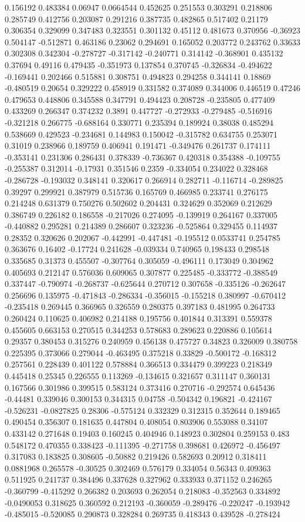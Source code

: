 0.156192 0.483384 0.06947 0.0664544 0.452625 0.251553 0.303291 0.218806 0.285749 0.412756 0.203087 0.291216 0.387735 0.482865 0.517402 0.21179 0.306354 0.329099 0.347483 0.323551 0.301132 0.45112 0.481673 0.370956 -0.36923 0.504147 -0.512871 0.463186 0.23062 0.294691 0.165052 0.203772 0.243762 0.33633 0.302308 0.342304 -0.278727 -0.317142 -0.240771 0.314142 -0.368901 0.435132 0.37694 0.49116 0.479435 -0.351973 0.137854 0.370745 -0.326834 -0.494622 -0.169441 0.202466 0.515881 0.308751 0.494823 0.294258 0.344141 0.18869 -0.480519 0.20654 0.329222 0.458919 0.331582 0.374089 0.344006 0.446519 0.47246 0.479653 0.448806 0.345588 0.347791 0.494423 0.208728 -0.235805 0.477409 0.433269 0.266347 0.374232 0.3891 0.447727 -0.272933 -0.279485 -0.516916 -0.321218 0.266775 -0.688164 0.330771 0.235394 0.189924 0.38038 0.485294 0.538669 0.429523 -0.234681 0.144983 0.150042 -0.315782 0.634755 0.253071 0.31019 0.238966 0.189759 0.406941 0.191471 -0.349476 0.261737 0.174111 -0.353141 0.231306 0.286431 0.378339 -0.736367 0.420318 0.354388 -0.109755 -0.255387 0.312014 -0.17931 0.351546 0.2359 -0.334054 0.234022 0.328468 -0.286728 -0.193032 0.348141 0.320617 0.266914 0.282711 -0.116714 -0.289825 0.39297 0.299921 0.387979 0.515736 0.165769 0.466985 0.233741 0.276175 0.214248 0.631379 0.750276 0.502602 0.204431 0.324629 0.352069 0.212629 0.386749 0.226182 0.186558 -0.217026 0.274095 -0.139919 0.264167 0.337005 -0.440882 0.295281 0.214389 0.286607 0.323236 -0.525864 0.329455 0.114937 0.28352 0.320626 0.202067 -0.442991 -0.447481 -0.195512 0.0533741 0.254785 0.363676 0.16402 -0.17724 0.241628 -0.039334 0.740965 0.198433 0.298548 0.335685 0.31373 0.455507 -0.307764 0.305059 -0.496111 0.173049 0.304962 0.405693 0.212147 0.576036 0.609065 0.307877 0.225485 -0.333772 -0.388549 0.337447 -0.790974 -0.268737 -0.625644 0.270712 0.307658 -0.335126 -0.262647 0.256696 0.135975 -0.471843 -0.286334 -0.356015 -0.155218 0.380997 -0.670412 -0.235418 0.269445 0.366965 0.326559 0.280375 0.397183 0.481995 0.264733 0.260424 0.110625 0.406982 0.214188 0.195756 0.401844 0.313391 0.559378 0.455605 0.663153 0.270515 0.344253 0.578683 0.289623 0.220886 0.105614 0.29357 0.380453 0.315276 0.240959 0.456138 0.475727 0.34823 0.326009 0.380758 0.225395 0.373066 0.279044 -0.463495 0.375218 0.33829 -0.500172 -0.168312 0.257561 0.228439 0.401122 0.578884 0.366513 0.334479 0.399223 0.218349 0.445418 0.25345 0.226555 0.113269 -0.134615 0.321657 0.311147 0.360131 0.167566 0.301986 0.399515 0.583124 0.373416 0.270716 -0.292574 0.645436 -0.44481 0.339046 0.300153 0.344315 0.04758 -0.504342 0.196821 -0.424167 -0.526231 -0.0827825 0.28306 -0.575124 0.332329 0.312315 0.352644 0.189465 0.490454 0.356307 0.181635 0.447804 0.408054 0.803906 0.553088 0.34107 0.433142 0.271648 0.19403 0.160245 0.404946 0.148923 0.302804 0.259153 0.483 0.548172 0.470355 0.338423 -0.111395 -0.271758 0.398681 0.426972 -0.456497 0.317083 0.183825 0.308605 -0.50882 0.219426 0.582693 0.20912 0.318411 0.0881968 0.265578 -0.30525 0.302469 0.576179 0.334054 0.56343 0.409363 0.511925 0.241737 0.384496 0.337628 0.327962 0.333933 0.371152 0.246265 -0.360799 -0.415292 0.266382 0.203693 0.262054 0.218083 -0.352563 0.334892 -0.0490053 0.318625 0.360592 0.212193 -0.360059 -0.289476 -0.220247 -0.193942 -0.485015 -0.520085 0.290873 0.328284 0.269735 0.418343 0.439528 -0.278424 